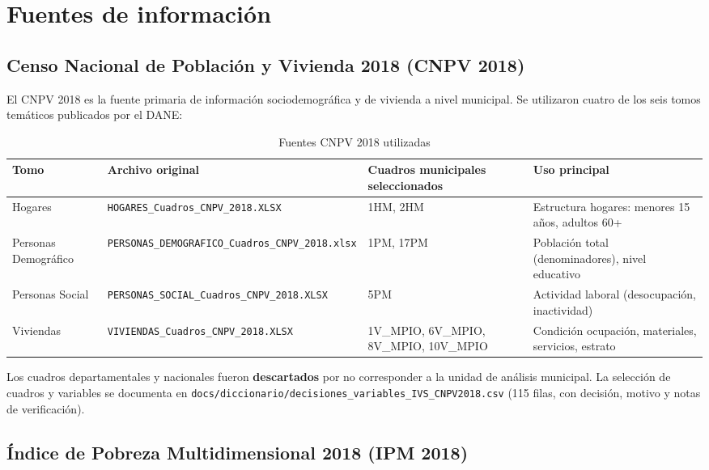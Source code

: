 \section{Fuentes de información}
\label{ch:fuentes}

\subsection{Censo Nacional de Población y Vivienda 2018 (CNPV 2018)}
\label{sec:cnpv}

El CNPV 2018 es la fuente primaria de información sociodemográfica y de vivienda a nivel municipal. Se utilizaron cuatro de los seis tomos temáticos publicados por el DANE:

\begin{table}[htbp]
\centering
\caption{Fuentes CNPV 2018 utilizadas}
\label{tab:fuentes_cnpv}
\begin{adjustbox}{max width=\textwidth}
\begin{tabular}{@{}llll@{}}
\toprule
\textbf{Tomo} & \textbf{Archivo original} & \textbf{Cuadros municipales seleccionados} & \textbf{Uso principal} \\
\midrule
Hogares & \texttt{HOGARES\_Cuadros\_CNPV\_2018.XLSX} & 1HM, 2HM & Estructura hogares: menores 15 años, adultos 60+ \\
Personas Demográfico & \texttt{PERSONAS\_DEMOGRAFICO\_Cuadros\_CNPV\_2018.xlsx} & 1PM, 17PM & Población total (denominadores), nivel educativo \\
Personas Social & \texttt{PERSONAS\_SOCIAL\_Cuadros\_CNPV\_2018.XLSX} & 5PM & Actividad laboral (desocupación, inactividad) \\
Viviendas & \texttt{VIVIENDAS\_Cuadros\_CNPV\_2018.XLSX} & 1V\_MPIO, 6V\_MPIO, 8V\_MPIO, 10V\_MPIO & Condición ocupación, materiales, servicios, estrato \\
\bottomrule
\end{tabular}
\end{adjustbox}
\end{table}

Los cuadros departamentales y nacionales fueron \textbf{descartados} por no corresponder a la unidad de análisis municipal. La selección de cuadros y variables se documenta en \texttt{docs/diccionario/decisiones\_variables\_IVS\_CNPV2018.csv} (115 filas, con decisión, motivo y notas de verificación).

\subsection{Índice de Pobreza Multidimensional 2018 (IPM 2018)}
\label{sec:ipm}
\label{sec:ipm_validacion}

